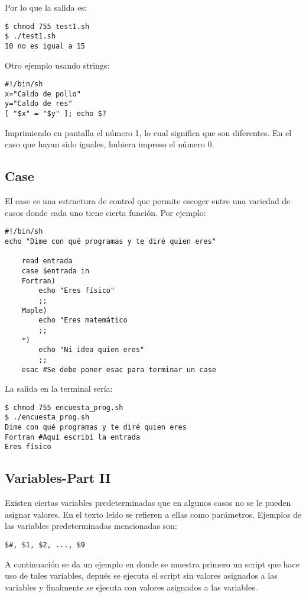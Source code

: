 \documentclass[a4paper]{article}
\begin{document}
Por lo que la salida es:

\begin{verbatim}
$ chmod 755 test1.sh
$ ./test1.sh
10 no es igual a 15
\end{verbatim}

Otro ejemplo usando strings:
\begin{verbatim}
#!/bin/sh
x="Caldo de pollo"
y="Caldo de res"
[ "$x" = "$y" ]; echo $? 
\end{verbatim}
Imprimiendo en pantalla el número 1, lo cual significa que son diferentes. En el caso que hayan sido iguales, hubiera impreso el número 0.


\subsection{Case}
El case es una estructura de control que permite escoger entre una variedad de casos donde cada uno tiene cierta función. Por ejemplo:

\begin{verbatim}
#!/bin/sh
echo "Dime con qué programas y te diré quien eres"

	read entrada
    case $entrada in
    Fortran)
    	echo "Eres físico"
        ;;
	Maple)
    	echo "Eres matemático
        ;;
    *)
    	echo "Ni idea quien eres"
        ;;
    esac #Se debe poner esac para terminar un case	
\end{verbatim}

La salida en la terminal sería:

\begin{verbatim}
$ chmod 755 encuesta_prog.sh
$ ./encuesta_prog.sh
Dime con qué programas y te diré quien eres
Fortran #Aquí escribí la entrada
Eres físico
\end{verbatim}

\subsection{Variables-Part II}
Existen ciertas variables predeterminadas que en algunos casos no se le pueden asignar valores. 
En el texto leído se refieren a ellas como parámetros. Ejemplos de las variables predeterminadas mencionadas son:

\begin{verbatim}
$#, $1, $2, ..., $9
\end{verbatim}

A continuación se da un ejemplo en donde se muestra primero un script que hace uso de tales variables, depués se ejecuta el script sin valores asignados a las variables y finalmente se ejecuta con valores asignados a las variables.
\end{document}
